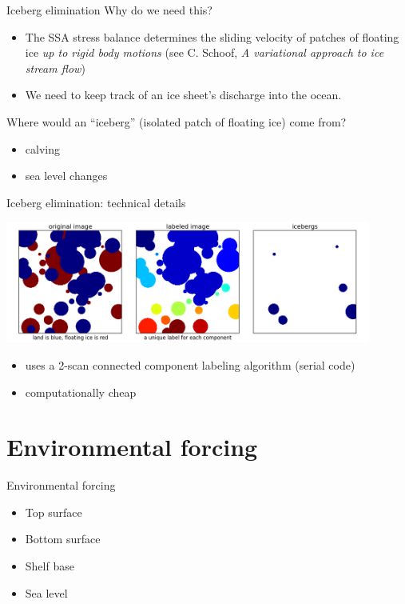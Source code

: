 \documentclass[notes,intlimits]{beamer}
\begin{document}
\begin{frame}{Iceberg elimination}
  Why do we need this?

  \begin{itemize}
  \item The SSA stress balance determines the sliding velocity of
    patches of floating ice \emph{up to rigid body motions} (see C.
    Schoof, \emph{A variational approach to ice stream flow})
  \item We need to keep track of an ice sheet's discharge into the
    ocean.
  \end{itemize}

  Where would an ``iceberg'' (isolated patch of floating ice) come
  from?
  \begin{itemize}
  \item calving
  \item sea level changes
  \end{itemize}
\end{frame}

\begin{frame}{Iceberg elimination: technical details}

  \begin{center}
    \includegraphics[width=0.9\textwidth]{icebergs.png}
  \end{center}

  \begin{itemize}
  \item uses a 2-scan connected component labeling algorithm (serial code)
  \item computationally cheap
  \end{itemize}
\end{frame}

\section{Environmental forcing}
\label{sec:environment}

\begin{frame}{Environmental forcing}
  \begin{itemize}
  \item Top surface
  \item Bottom surface
  \item Shelf base
  \item Sea level
  \end{itemize}
\end{frame}
\end{document}
